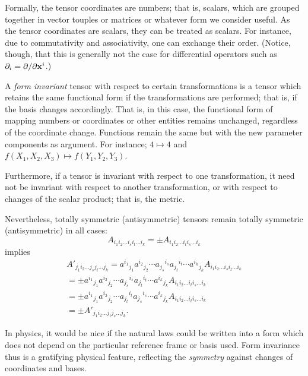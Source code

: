Formally, the tensor coordinates are numbers; that is, scalars,
which are grouped together in vector touples or matrices or whatever form we consider useful.
As the tensor coordinates are scalars, they can be treated as scalars.
For instance, due to commutativity and associativity, one can exchange
their order. (Notice, though, that this is generally not the case for
differential operators such as $\partial_i=\partial / \partial {\bf x}^i$.)

A {\em form invariant} tensor with respect to  certain transformations
is a tensor which retains
the same functional form if the transformations are performed; that is,
if the basis changes accordingly.
That is, in this case,
the functional form of mapping numbers or coordinates or other entities remains unchanged, regardless of the coordinate change.
Functions remain the same but with the new parameter components as
argument. For instance; $4\mapsto 4$ and $f(X_1,X_2,X_3)\mapsto
f( Y _1, Y _2, Y _3)$.

Furthermore, if a tensor is invariant with respect to one transformation, it need not
be invariant with respect to another transformation, or with respect to
changes of the scalar product; that is, the metric.

Nevertheless, totally symmetric (antisymmetric) tensors remain totally
symmetric (antisymmetric) in all cases:
\begin{equation}
A_{i_1i_2 \ldots i_si_t\ldots i_k}
=
\pm A_{i_1i_2 \ldots i_ti_s\ldots i_k}
\end{equation}
implies
\begin{equation}
\begin{split}
A'_{j_1i_2 \ldots j_s j_t\ldots j_k}
=
{a^{i_1}}_{j_1}{a^{i_2}}_{j_2}
\cdots
{a_{j_s}}^{i_s}{a_{j_t}}^{i_t}
\cdots
{a^{i_k}}_{j_k} A_{i_1 i_2\ldots i_s i_t\ldots  i_k}
 \\
=
\pm {a^{i_1}}_{j_1}{a^{i_2}}_{j_2}\cdots
{a_{j_s}}^{i_s}{a_{j_t}}^{i_t}\cdots
{a^{i_k}}_{j_k} A_{i_1 i_2\ldots i_t i_s\ldots  i_k}
  \\
=
\pm {a^{i_1}}_{j_1}{a^{i_2}}_{j_2}
\cdots
{a_{j_t}}^{i_t}{a_{j_s}}^{i_s}
\cdots
{a^{i_k}}_{j_k} A_{i_1 i_2\ldots i_t i_s\ldots  i_k}
  \\
=
\pm A'_{j_1i_2 \ldots j_t j_s\ldots j_k}    .
\end{split}
\end{equation}


In physics, it would be nice if the natural laws could be written into a
form which does not depend on the particular reference frame or  basis
used.
Form invariance thus is a gratifying physical feature, reflecting the
{\em symmetry} against changes of coordinates and bases.

